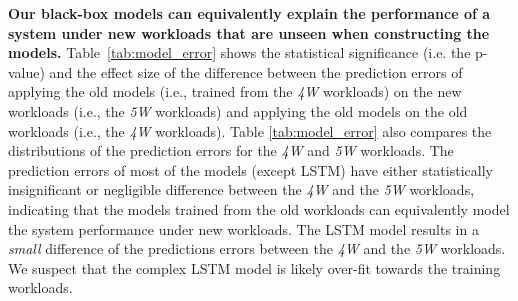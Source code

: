 \noindent\textbf{Our black-box models can equivalently explain the performance of a system under new workloads that are unseen when constructing the models.}
Table~\ref{tab:model_error} shows the statistical significance (i.e. the p-value) and the effect size of the difference between the prediction errors of applying the old models (i.e., trained from the \emph{4W} workloads) on the new workloads (i.e., the \emph{5W} workloads) and applying the old models on the old workloads (i.e., the \emph{4W} workloads). 
Table \ref{tab:model_error} also compares the distributions of the prediction errors for the \emph{4W} and \emph{5W} workloads.
The prediction errors of most of the models (except LSTM) have either statistically insignificant or negligible difference between the \emph{4W} and the \emph{5W} workloads, indicating that the models trained from the old workloads can equivalently model the system performance under new workloads.
The LSTM model results in a \emph{small} difference of the predictions errors between the \emph{4W} and the \emph{5W} workloads. We suspect that the complex LSTM model is likely over-fit towards the training workloads.

